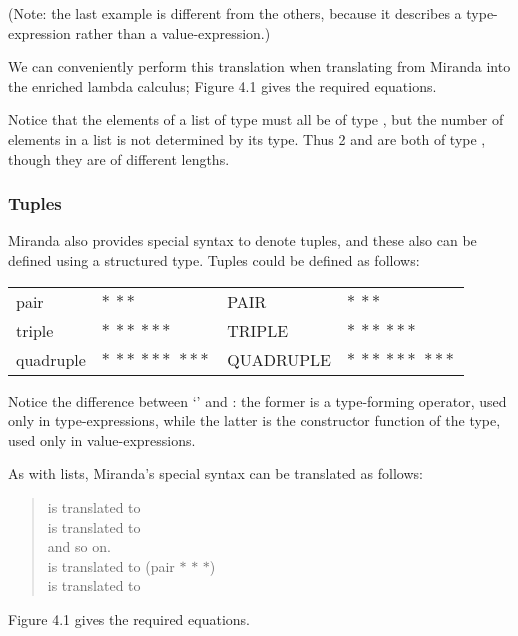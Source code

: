 \noindent(Note: the last example is different from the others, because it describes a type-expression rather than a value-expression.)

We can conveniently perform this translation when translating from Miranda into the enriched lambda calculus; Figure 4.1 gives the required equations.

Notice that the elements of a list of type  must all be of type \ml{$*$}, but the number of elements in a list is not determined by its type. Thus  2  and  are both of type , though they are of different lengths.

\subsubsection{Tuples}

Miranda also provides special syntax to denote tuples, and these also can be defined using a structured type. Tuples could be defined as follows:

\begin{mlcoded}
    \footnotesize
    \begin{tabular}{llll}
    pair        & $*\ **$           &\typedecl{} PAIR        & $*\ **$ \\
    triple      & $*\ **\ ***$       &\typedecl{} TRIPLE      & $*\ **\ ***$ \\
    quadruple   & $*\ **\ ***\ ***$   &\typedecl{} QUADRUPLE   & $*\ **\ ***\ ***$
    \end{tabular}
\end{mlcoded}

Notice the difference between `' and : the former is a type-forming operator, used only in type-expressions, while the latter is the constructor function of the type, used only in value-expressions.

As with lists, Miranda's special syntax can be translated as follows:
\begin{quote}
     is translated to \\
     is translated to \\
    and so on.\\
    \ml{($*$, $**$)} is translated to (pair $*$ $*$ $*$)\\
    \ml{($*$, $**$, $***$)} is translated to 
\end{quote}
Figure 4.1 gives the required equations.

